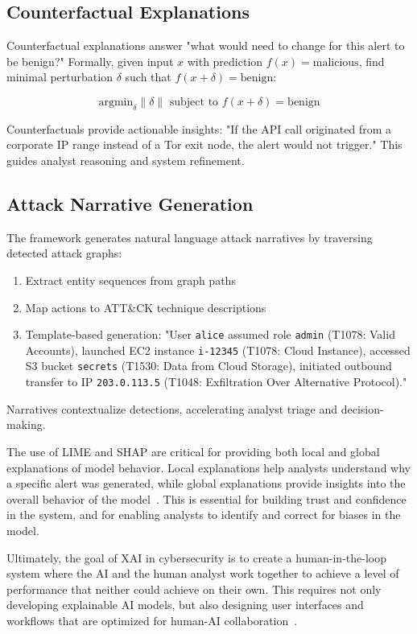 \subsection{Counterfactual Explanations}
Counterfactual explanations answer "what would need to change for this alert to be benign?" Formally, given input $x$ with prediction $f(x) = \text{malicious}$, find minimal perturbation $\delta$ such that $f(x + \delta) = \text{benign}$:

$$\text{argmin}_{\delta} \|\delta\| \text{ subject to } f(x + \delta) = \text{benign}$$

Counterfactuals provide actionable insights: "If the API call originated from a corporate IP range instead of a Tor exit node, the alert would not trigger." This guides analyst reasoning and system refinement.

\subsection{Attack Narrative Generation}
The framework generates natural language attack narratives by traversing detected attack graphs:
\begin{enumerate}
    \item Extract entity sequences from graph paths
    \item Map actions to ATT\&CK technique descriptions
    \item Template-based generation: "User \texttt{alice} assumed role \texttt{admin} (T1078: Valid Accounts), launched EC2 instance \texttt{i-12345} (T1078: Cloud Instance), accessed S3 bucket \texttt{secrets} (T1530: Data from Cloud Storage), initiated outbound transfer to IP \texttt{203.0.113.5} (T1048: Exfiltration Over Alternative Protocol)."
\end{enumerate}

Narratives contextualize detections, accelerating analyst triage and decision-making.

The use of LIME and SHAP are critical for providing both local and global explanations of model behavior. Local explanations help analysts understand why a specific alert was generated, while global explanations provide insights into the overall behavior of the model~\cite{rackenzik2024xai}. This is essential for building trust and confidence in the system, and for enabling analysts to identify and correct for biases in the model.

Ultimately, the goal of XAI in cybersecurity is to create a human-in-the-loop system where the AI and the human analyst work together to achieve a level of performance that neither could achieve on their own. This requires not only developing explainable AI models, but also designing user interfaces and workflows that are optimized for human-AI collaboration~\cite{frontiersin2024humanloop}.

